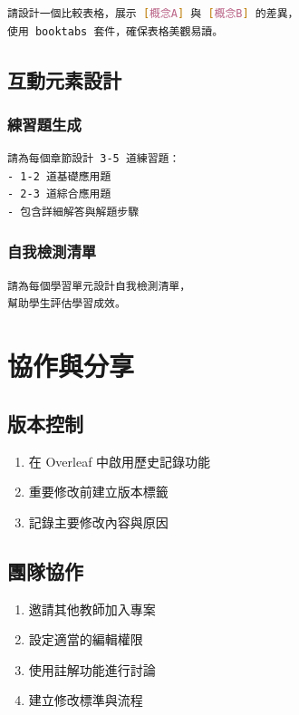 \documentclass[12pt,a4paper]{article}
\begin{document}
\begin{lstlisting}[language=bash]
請設計一個比較表格，展示 [概念A] 與 [概念B] 的差異，
使用 booktabs 套件，確保表格美觀易讀。
\end{lstlisting}

\subsection{互動元素設計}

\subsubsection{練習題生成}

\begin{lstlisting}[language=bash]
請為每個章節設計 3-5 道練習題：
- 1-2 道基礎應用題
- 2-3 道綜合應用題
- 包含詳細解答與解題步驟
\end{lstlisting}

\subsubsection{自我檢測清單}

\begin{lstlisting}[language=bash]
請為每個學習單元設計自我檢測清單，
幫助學生評估學習成效。
\end{lstlisting}

\section{協作與分享}

\subsection{版本控制}

\begin{enumerate}
    \item 在 Overleaf 中啟用歷史記錄功能
    \item 重要修改前建立版本標籤
    \item 記錄主要修改內容與原因
\end{enumerate}

\subsection{團隊協作}

\begin{enumerate}
    \item 邀請其他教師加入專案
    \item 設定適當的編輯權限
    \item 使用註解功能進行討論
    \item 建立修改標準與流程
\end{enumerate}
\end{document}
